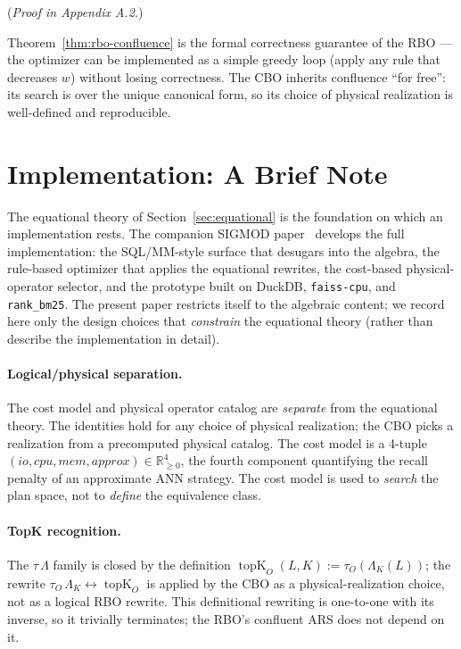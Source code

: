 \documentclass[acmsmall,review,anonymous]{acmart}
\theoremstyle{plain}
\theoremstyle{definition}
\newcommand{\topK}{\operatorname{topK}}
\theoremstyle{remark}
\begin{document}
(\textit{Proof in Appendix A.2.})

Theorem~\ref{thm:rbo-confluence} is the formal correctness guarantee
of the RBO --- the optimizer can be implemented as a simple greedy
loop (apply any rule that decreases $w$) without losing correctness.
The CBO inherits confluence ``for free'': its search is over the
unique canonical form, so its choice of physical realization is
well-defined and reproducible.

\section{Implementation: A Brief Note}\label{sec:impl}

The equational theory of Section~\ref{sec:equational} is the
foundation on which an implementation rests. The companion
SIGMOD paper~\cite{companion2026sigmod} develops the full
implementation: the SQL/MM-style surface that desugars into the
algebra, the rule-based optimizer that applies the equational
rewrites, the cost-based physical-operator selector, and the
prototype built on DuckDB, \texttt{faiss-cpu}, and
\texttt{rank\_bm25}. The present paper restricts itself to the
algebraic content; we record here only the design choices that
\emph{constrain} the equational theory (rather than describe the
implementation in detail).

\paragraph{Logical/physical separation.}
The cost model and physical operator catalog are
\emph{separate} from the equational theory. The identities
hold for any choice of physical realization; the CBO picks a
realization from a precomputed physical catalog. The cost model
is a 4-tuple $(\mathit{io}, \mathit{cpu}, \mathit{mem},
\mathit{approx}) \in \mathbb{R}^4_{\geq 0}$, the fourth component
quantifying the recall penalty of an approximate ANN strategy.
The cost model is used to \emph{search} the plan space, not to
\emph{define} the equivalence class.

\paragraph{TopK recognition.}
The $\tau\, \Lambda$ family is closed by the definition
$\topK_O(L, K) := \tau_O(\Lambda_K(L))$; the rewrite
$\tau_O\,\Lambda_K \leftrightarrow \topK_O$ is applied by the CBO
as a physical-realization choice, not as a logical RBO rewrite.
This definitional rewriting is one-to-one with its inverse, so it
trivially terminates; the RBO's confluent ARS does not depend on it.
\end{document}
